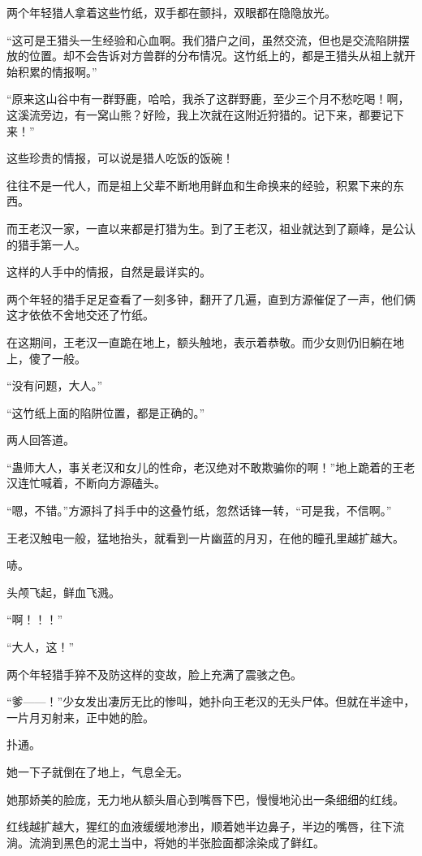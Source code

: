 
\begin{this_body}

两个年轻猎人拿着这些竹纸，双手都在颤抖，双眼都在隐隐放光。

“这可是王猎头一生经验和心血啊。我们猎户之间，虽然交流，但也是交流陷阱摆放的位置。却不会告诉对方兽群的分布情况。这竹纸上的，都是王猎头从祖上就开始积累的情报啊。”

“原来这山谷中有一群野鹿，哈哈，我杀了这群野鹿，至少三个月不愁吃喝！啊，这溪流旁边，有一窝山熊？好险，我上次就在这附近狩猎的。记下来，都要记下来！”

这些珍贵的情报，可以说是猎人吃饭的饭碗！

往往不是一代人，而是祖上父辈不断地用鲜血和生命换来的经验，积累下来的东西。

而王老汉一家，一直以来都是打猎为生。到了王老汉，祖业就达到了巅峰，是公认的猎手第一人。

这样的人手中的情报，自然是最详实的。

两个年轻的猎手足足查看了一刻多钟，翻开了几遍，直到方源催促了一声，他们俩这才依依不舍地交还了竹纸。

在这期间，王老汉一直跪在地上，额头触地，表示着恭敬。而少女则仍旧躺在地上，傻了一般。

“没有问题，大人。”

“这竹纸上面的陷阱位置，都是正确的。”

两人回答道。

“蛊师大人，事关老汉和女儿的性命，老汉绝对不敢欺骗你的啊！”地上跪着的王老汉连忙喊着，不断向方源磕头。

“嗯，不错。”方源抖了抖手中的这叠竹纸，忽然话锋一转，“可是我，不信啊。”

王老汉触电一般，猛地抬头，就看到一片幽蓝的月刃，在他的瞳孔里越扩越大。

哧。

头颅飞起，鲜血飞溅。

“啊！！！”

“大人，这！”

两个年轻猎手猝不及防这样的变故，脸上充满了震骇之色。

“爹——！”少女发出凄厉无比的惨叫，她扑向王老汉的无头尸体。但就在半途中，一片月刃射来，正中她的脸。

扑通。

她一下子就倒在了地上，气息全无。

她那娇美的脸庞，无力地从额头眉心到嘴唇下巴，慢慢地沁出一条细细的红线。

红线越扩越大，猩红的血液缓缓地渗出，顺着她半边鼻子，半边的嘴唇，往下流淌。流淌到黑色的泥土当中，将她的半张脸面都涂染成了鲜红。


\end{this_body}
